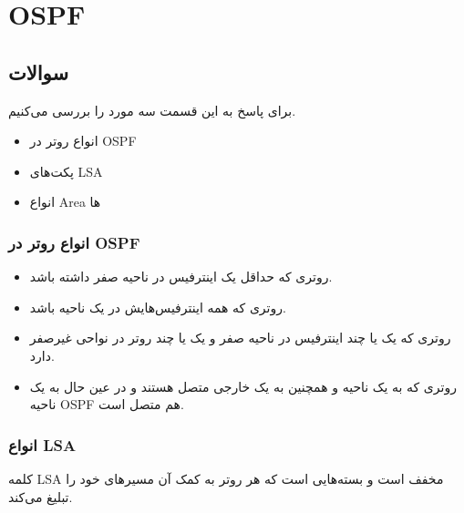 \documentclass[12pt]{article}
\begin{document}
\newpage

\section{OSPF}

\subsection{سوالات}


برای پاسخ به این قسمت سه مورد را بررسی می‌کنیم.

\begin{itemize}
	\item انواع روتر در OSPF
	
	\item پکت‌های LSA
	
	\item انواع Area ها
	
	
\end{itemize}


\subsubsection{انواع روتر در OSPF}

\begin{itemize}
	\item {}
	روتری که حداقل یک اینترفیس در ناحیه صفر داشته باشد.
	
	\item 
	روتری که همه اینترفیس‌هایش در یک ناحیه باشد.
	
	\item 
	روتری که یک یا چند اینترفیس در ناحیه صفر و یک یا چند روتر در نواحی غیرصفر دارد.
	
	\item 
	روتری که به یک ناحیه و همچنین به یک  خارجی متصل هستند و در عین حال به یک ناحیه OSPF هم متصل است. 
\end{itemize}

\subsubsection{انواع LSA}

کلمه LSA مخفف
است و بسته‌هایی است که هر روتر  به کمک آن مسیر‌های خود را تبلیغ می‌کند.
\end{document}
